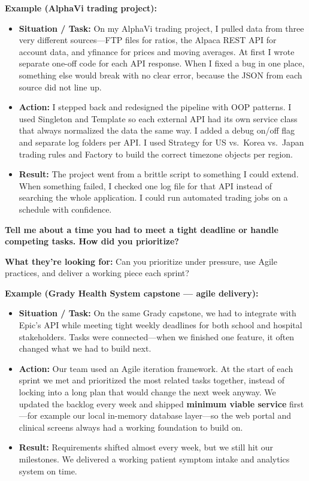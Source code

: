 \textbf{Example (AlphaVi trading project):}
\begin{itemize}
  \item \textbf{Situation / Task:} On my AlphaVi trading project, I pulled data from three very different sources---FTP files for ratios, the Alpaca REST API for account data, and yfinance for prices and moving averages. At first I wrote separate one-off code for each API response. When I fixed a bug in one place, something else would break with no clear error, because the JSON from each source did not line up.
  \item \textbf{Action:} I stepped back and redesigned the pipeline with OOP patterns. I used Singleton and Template so each external API had its own service class that always normalized the data the same way. I added a debug on/off flag and separate log folders per API. I used Strategy for US vs.\ Korea vs.\ Japan trading rules and Factory to build the correct timezone objects per region.
  \item \textbf{Result:} The project went from a brittle script to something I could extend. When something failed, I checked one log file for that API instead of searching the whole application. I could run automated trading jobs on a schedule with confidence.
\end{itemize}

\newpage

\question[0]
\textbf{Tell me about a time you had to meet a tight deadline or handle competing tasks. How did you prioritize?}

\textbf{What they're looking for:} Can you prioritize under pressure, use Agile practices, and deliver a working piece each sprint?

\textbf{Example (Grady Health System capstone --- agile delivery):}
\begin{itemize}
  \item \textbf{Situation / Task:} On the same Grady capstone, we had to integrate with Epic's API while meeting tight weekly deadlines for both school and hospital stakeholders. Tasks were connected---when we finished one feature, it often changed what we had to build next.
  \item \textbf{Action:} Our team used an Agile iteration framework. At the start of each sprint we met and prioritized the most related tasks together, instead of locking into a long plan that would change the next week anyway. We updated the backlog every week and shipped \textbf{minimum viable service} first---for example our local in-memory database layer---so the web portal and clinical screens always had a working foundation to build on.
  \item \textbf{Result:} Requirements shifted almost every week, but we still hit our milestones. We delivered a working patient symptom intake and analytics system on time.
\end{itemize}

